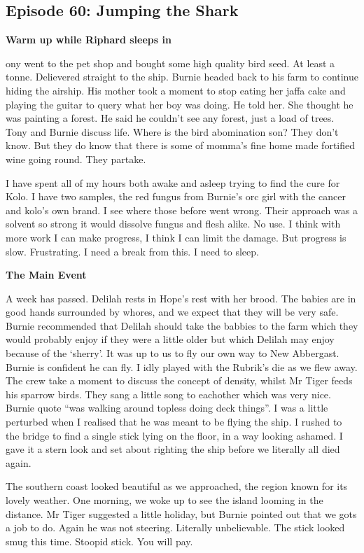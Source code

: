 \subsection{Episode 60: Jumping the Shark}

\textbf{Warm up while Riphard sleeps in}\medskip

ony went to the pet shop and bought some high quality bird seed. At least a tonne. Delievered straight to the ship. Burnie headed back to his farm to continue hiding the airship. His mother took a moment to stop eating her jaffa cake and playing the guitar to query what her boy was doing. He told her. She thought he was painting a forest. He said he couldn’t see any forest, just a load of trees. Tony and Burnie discuss life. Where is the bird abomination son? They don’t know. But they do know that there is some of momma’s fine home made fortified wine going round. They partake.\medskip

I have spent all of my hours both awake and asleep trying to find the cure for Kolo. I have two samples, the red fungus from Burnie’s orc girl with the cancer and kolo’s own brand. I see where those before went wrong. Their approach was a solvent so strong it would dissolve fungus and flesh alike. No use. I think with more work I can make progress, I think I can limit the damage. But progress is slow. Frustrating. I need a break from this. I need to sleep.\medskip

\textbf{The Main Event}\medskip

A week has passed. Delilah rests in Hope’s rest with her brood. The babies are in good hands surrounded by whores, and we expect that they will be very safe. Burnie recommended that Delilah should take the babbies to the farm which they would probably enjoy if they were a little older but which Delilah may enjoy because of the ‘sherry’. It was up to us to fly our own way to New Abbergast. Burnie is confident he can fly. I idly played with the Rubrik’s die as we flew away. The crew take a moment to discuss the concept of density, whilst Mr Tiger feeds his sparrow birds. They sang a little song to eachother which was very nice. Burnie quote “was walking around topless doing deck things”. I was a little perturbed when I realised that he was meant to be flying the ship. I rushed to the bridge to find a single stick lying on the floor, in a way looking ashamed. I gave it a stern look and set about righting the ship before we literally all died again.\medskip

The southern coast looked beautiful as we approached, the region known for its lovely weather. One morning, we woke up to see the island looming in the distance. Mr Tiger suggested a little holiday, but Burnie pointed out that we gots a job to do. Again he was not steering. Literally unbelievable. The stick looked smug this time. Stoopid stick. You will pay.\medskip

